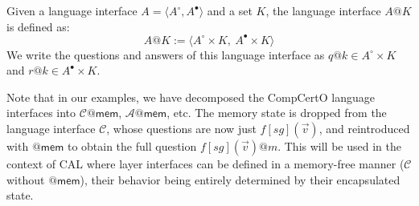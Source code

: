 \documentclass[acmsmall,screen,review,anonymous]{acmart}
\newcommand{\kw}[1]{\ensuremath{ \mathsf{#1} }}
\newcommand{\que}{\circ}
\newcommand{\ans}{\bullet}
\begin{document}
\begin{definition}
Given a language interface $A = \langle A^\que, A^\ans \rangle$
and a set $K$,
the language interface $A@K$ is defined as:
\[
  A@K := \langle A^\que \times K ,\: A^\ans \times K \rangle
\]
We write the questions and answers of this language interface as
$q@k \in A^\que \times K$ and
$r@k \in A^\ans \times K$.
\end{definition}

Note that in our examples,
we have decomposed the CompCertO language interfaces
into $\mathcal{C}@\kw{mem}$, $\mathcal{A}@\kw{mem}$, etc.
The memory state is dropped from the language interface $\mathcal{C}$,
whose questions are now just $f[\mathit{sg}](\vec{v})$,
and reintroduced with $@\kw{mem}$ to obtain
the full question $f[\mathit{sg}](\vec{v})@m$.
This will be used in the context of CAL
where layer interfaces can be defined in a memory-free manner
($\mathcal{C}$ without $@\kw{mem}$),
their behavior being entirely determined by their encapsulated state.
\end{document}
